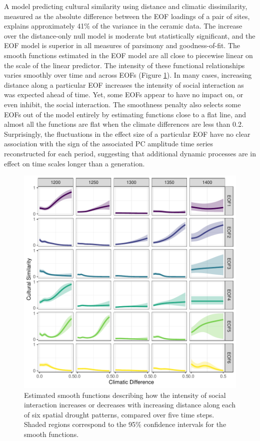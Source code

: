 \documentclass[10pt]{iopart}
\begin{document}
A model predicting cultural similarity using distance and climatic dissimilarity, measured as the absolute difference between the EOF loadings of a pair of sites, explains approximately 41\% of the variance in the ceramic data. The increase over the distance-only null model is moderate but statistically significant, and the EOF model is superior in all measures of parsimony and goodness-of-fit. The smooth functions estimated in the EOF model are all close to piecewise linear on the scale of the linear predictor. The intensity of these functional relationships varies smoothly over time and across EOFs (Figure \ref{fig:smooths}). In many cases, increasing distance along a particular EOF increases the intensity of social interaction as was expected ahead of time. Yet, some EOFs appear to have no impact on, or even inhibit, the social interaction. The smoothness penalty also selects some EOFs out of the model entirely by estimating functions close to a flat line, and almost all the functions are flat when the climate differences are less than 0.2. Surprisingly, the fluctuations in the effect size of a particular EOF have no clear association with the sign of the associated PC amplitude time series reconstructed for each period, suggesting that additional dynamic processes are in effect on time scales longer than a generation. 



\begin{figure}[!htbp]
\centering
\includegraphics[width=.8\linewidth]{figures/smooths.pdf}
\caption{Estimated smooth functions describing how the intensity of social interaction increases or decreases with increasing distance along each of six spatial drought patterns, compared over five time steps. Shaded regions correspond to the 95\% confidence intervals for the smooth functions.}
\label{fig:smooths}
\end{figure}
\end{document}
